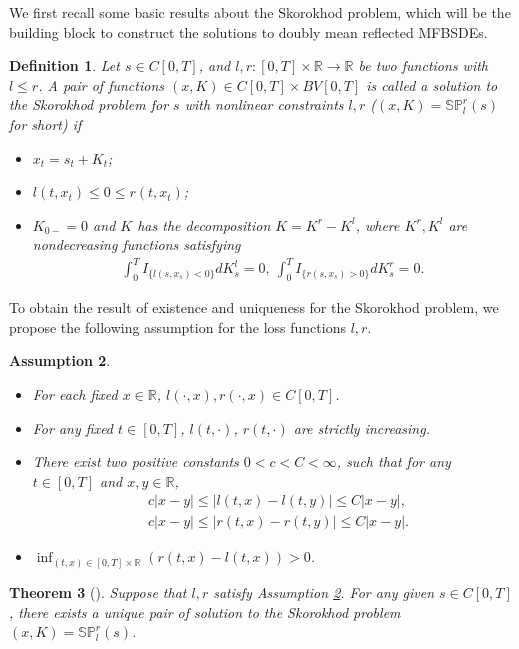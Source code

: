 \documentclass[10pt]{article}%
\numberwithin{equation}{section}
\newtheorem{theorem}{Theorem}[section]
\newtheorem{definition}[theorem]{Definition}
\newtheorem{assumption}[theorem]{Assumption}
\begin{document}
We first recall some basic results about the Skorokhod problem, which will be the building block to construct the solutions to doubly mean reflected MFBSDEs.
\begin{definition}\label{def1}
Let $s\in C[0,T]$,  and $l,r:[0,T] \times \mathbb{R}\rightarrow \mathbb{R}$ be two functions with $l\leq r$.  A pair of functions $(x,K)\in C[0,T]\times BV[0,T]$ is called a solution to the  Skorokhod problem for $s$ with nonlinear constraints $l,r$ ($(x,K)=\mathbb{SP}_l^r(s)$ for short) if %
\begin{itemize}
\item[(i)] $x_t=s_t+K_t$;
\item[(ii)] $l(t,x_t)\leq 0\leq r(t,x_t)$;
\item[(iii)]  $K_{0-}=0$ and $K$ has the decomposition $K=K^r-K^l$, where $K^r,K^l$ are nondecreasing functions satisfying  
\begin{align}
\int_0^{T} I_{\{l(s,x_s)<0\}}dK^l_s=0, \  \int_0^{T} I_{\{r(s,x_s)>0\}}dK^r_s=0.
\end{align}
\end{itemize}
\end{definition}

To obtain the result of existence and uniqueness for the Skorokhod problem, we propose the following assumption for the loss functions $l,r$.
\begin{assumption}\label{asslr}
\begin{itemize}
\item[(i)] For each fixed $x\in\mathbb{R}$, $l(\cdot,x),r(\cdot,x)\in C[0,T]$.
\item[(ii)] For any fixed $t\in [0,T]$, $l(t,\cdot)$, $r(t,\cdot)$ are strictly increasing.
\item[(iii)] There exist two positive constants $0<c<C<\infty$, such that for any $t\in [0,T]$ and $x,y\in \mathbb{R}$,
\begin{align*}
&c|x-y|\leq |l(t,x)-l(t,y)|\leq C|x-y|,\\
&c|x-y|\leq |r(t,x)-r(t,y)|\leq C|x-y|.
\end{align*} 
\item[(iv)] $\inf_{(t,x)\in[0,T]\times\mathbb{R}}(r(t,x)-l(t,x))>0$.
\end{itemize}
\end{assumption}
\begin{theorem}[\cite{Li}]\label{SP}
Suppose that $l,r$ satisfy Assumption \ref{asslr}. For any given $s\in C[0,T]$, there exists a unique pair of solution to the Skorokhod problem $(x,K)=\mathbb{SP}_l^r(s)$.
\end{theorem}
\end{document}
